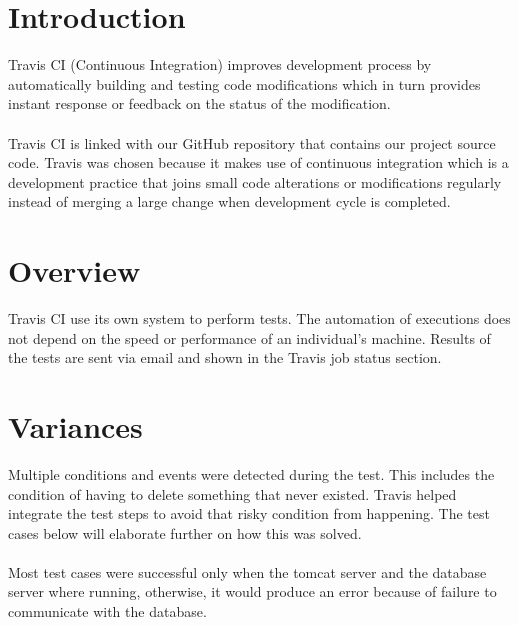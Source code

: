 \documentclass[a4paper, 12pt, oneside]{article}
\begin{document}
\newpage
\tableofcontents
\newpage




\pagebreak



\section{Introduction}



Travis CI (Continuous Integration) improves development process by automatically building and testing code modifications which in turn provides instant response or feedback on the status of the modification.
\\\\
Travis CI is linked with our GitHub repository that contains our project source code. Travis was chosen because it makes use of continuous integration which is a development practice that joins small code alterations or modifications regularly instead of merging a large change when development cycle is completed.




\section{Overview}

Travis CI use its own system to perform tests. The automation of executions does not depend on the speed or performance of an individual’s machine. Results of the tests are sent via email and shown in the Travis job status section.


\section{Variances}

Multiple conditions and events were detected during the test. This includes the condition of having to delete something that never existed. Travis helped integrate the test steps to avoid that risky condition from happening. The test cases below will elaborate further on how this was solved. \\\\Most test cases were successful only when the tomcat server and the database server where running, otherwise, it would produce an error because of failure to communicate with the database.
\end{document}
